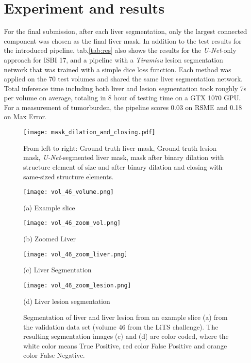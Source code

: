 \documentclass{article}
\begin{document}
\section{Experiment and results}
\label{sec:method}

For the final submission, after each liver segmentation, only the largest connected component was chosen as the final liver mask. In addition to the test results for the introduced pipeline, tab.\ref{tab:res} also shows the results for the \textit{U-Net}-only approach for ISBI 17, and a pipeline with a \textit{Tiramisu} lesion segmentation network that was trained with a simple dice loss function. Each method was applied on the 70 test volumes and shared the same liver segmentation network.
Total inference time including both liver and lesion segmentation took roughly 7s per volume on average, totaling in 8 hour of testing time on a GTX 1070 GPU.
For a measurement of tumorburden, the pipeline scores 0.03 on RSME and 0.18 on Max Error.

\begin{figure*}[htb]
\texttt{[image: mask\_dilation\_and\_closing.pdf]}
\caption{From left to right: Ground truth liver mask, Ground truth lesion mask, \textit{U-Net}-segmented liver mask, mask after binary dilation with structure element of size  and after binary dilation and closing with same-sized structure elements.}
\label{fig:bad_seg}
\end{figure*}




\begin{figure}[t]
\begin{minipage}[b]{0.48\linewidth}
  \centering
  \centerline{\texttt{[image: vol\_46\_volume.png]}}
\centerline{(a) Example slice}\medskip
\end{minipage}
\hfill
\begin{minipage}[b]{0.48\linewidth}
  \centering
  \centerline{\texttt{[image: vol\_46\_zoom\_vol.png]}}
\centerline{(b) Zoomed Liver}\medskip
\end{minipage}
\hfill
\begin{minipage}[b]{.48\linewidth}
  \centering
  \centerline{\texttt{[image: vol\_46\_zoom\_liver.png]}}
\centerline{(c) Liver Segmentation}\medskip
\end{minipage}
\hfill
\begin{minipage}[b]{0.48\linewidth}
  \centering
  \centerline{\texttt{[image: vol\_46\_zoom\_lesion.png]}}
\centerline{(d) Liver lesion segmentation}\medskip
\end{minipage}
\caption{Segmentation of liver and liver lesion from an example slice (a) from the validation data set (volume 46 from the LiTS challenge). The resulting segmentation images (c) and (d) are color coded, where the white color means True Positive, red color False Positive and orange color False Negative.}
\label{fig:segmentation}
\end{figure}
\end{document}
